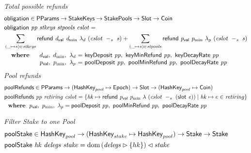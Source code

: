 \begin{figure}[htb]
  \emph{Total possible refunds}
  \begin{align*}
      & \fun{obligation} \in \PParams \to \StakeKeys \to \StakePools \to \Slot \to \Coin \\
      & \obligation{pp}{stkeys}{stpools}{cslot} =\\
      & \sum\limits_{(\_ \mapsto s) \in \var{stkeys}}
        \refund{d_{\mathsf{val}}}{d_{\min}}{\lambda_d}{(\slotminus{cslot}{s})}
        + \sum\limits_{(\_ \mapsto s) \in \var{stpools}}
        \refund{p_{\mathsf{val}}}{p_{\min}}{\lambda_p}{(\slotminus{cslot}{s})} \\
      &
      \begin{array}{lr@{~=~}l}
        \where
          & \dval,~d_{\min},~\lambda_d
          & \fun{keyDeposit}~\var{pp},~\fun{keyMinRefund}~\var{pp},~\fun{keyDecayRate}~\var{pp}
          \\
          & p_{\mathsf{val}},~p_{\min},~\lambda_p
          & \fun{poolDeposit}~\var{pp},~\fun{poolMinRefund}~\var{pp},~\fun{poolDecayRate}~\var{pp}
      \end{array}\\
  \end{align*}
  \emph{Pool refunds}
  \begin{align*}
      & \mathsf{poolRefunds} \in \mathsf{PParams} \to (\mathsf{HashKey}_{pool} \mapsto \mathsf{Epoch}) \to \mathsf{Slot} \to
      (\mathsf{HashKey}_{pool} \mapsto \mathsf{Coin}) \\
      & \mathsf{poolRefunds}~ \mathit{pp}~ \mathit{retiring}~ \mathit{cslot} = \left\{
        \mathit{hk}\mapsto
          \mathsf{refund}~ \mathit{p_{\mathsf{val}}}~ \mathit{p_{\min}}~ {\lambda}~ {(\mathit{cslot}~-_{s}~\mathit{(\mathsf{slot}~e)})}
          \mid
          \mathit{hk}\mapsto e\in\mathit{retiring}
        \right\}\\
      & ~ ~ \mathbf{where}~ ~  p_{\mathsf{val}},~p_{\min},~\lambda_p =
          \mathsf{poolDeposit}~\mathit{pp},~\mathsf{poolMinRefund}~\mathit{pp},~\mathsf{poolDecayRate}~\mathit{pp} \\
  \end{align*}

  \emph{Filter Stake to one Pool}
  \begin{align*}
      & \mathsf{poolStake} \in \mathsf{HashKey}_{pool} \to (\mathsf{HashKey}_{stake} \mapsto \mathsf{HashKey}_{pool})
        \to \mathsf{Stake} \to \mathsf{Stake} \\
      & \mathsf{poolStake}~ \mathit{hk}~ \mathit{delegs}~ \mathit{stake} =
        \operatorname{dom}{(\mathit{delegs}\rhd\{hk\})\lhd\mathit{stake}}
  \end{align*}


\end{figure}

